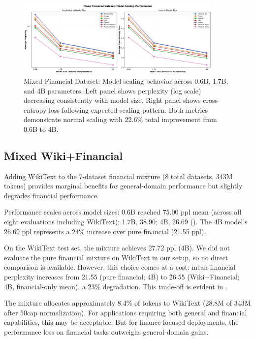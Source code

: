 \begin{figure}[h]
\centering
\includegraphics[width=0.9\textwidth]{figures/scaling_mixed_financial.png}
\caption[Mixed Financial Dataset: Scaling Behavior]{Mixed Financial Dataset: Model scaling behavior across 0.6B, 1.7B, and 4B parameters. Left panel shows perplexity (log scale) decreasing consistently with model size. Right panel shows cross-entropy loss following expected scaling pattern. Both metrics demonstrate normal scaling with 22.6\% total improvement from 0.6B to 4B.}
\label{fig:scaling_mixed_financial}
\end{figure}



\subsection{Mixed Wiki+Financial}

Adding WikiText to the 7-dataset financial mixture (8 total datasets, 343M tokens) provides marginal benefits for general-domain performance but slightly degrades financial performance.

Performance scales across model sizes: 0.6B reached 75.00 ppl mean (across all eight evaluations including WikiText); 1.7B, 38.90; 4B, 26.69 (). The 4B model's 26.69 ppl represents a 24\% increase over pure financial (21.55 ppl).

On the WikiText test set, the mixture achieves 27.72 ppl (4B). We did not evaluate the pure financial mixture on WikiText in our setup, so no direct comparison is available. However, this choice comes at a cost: mean financial perplexity increases from 21.55 (pure financial; 4B) to \~26.55 (Wiki+Financial; 4B, financial-only mean), a \~23\% degradation. This trade-off is evident in .

The mixture allocates approximately 8.4\% of tokens to WikiText (28.8M of 343M after 50cap normalization). For applications requiring both general and financial capabilities, this may be acceptable. But for finance-focused deployments, the performance loss on financial tasks outweighs general-domain gains.

